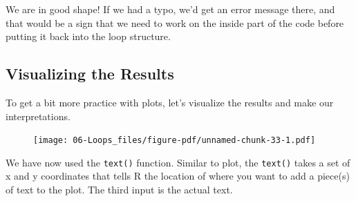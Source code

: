 \documentclass[
  letterpaper,
  DIV=11,
  numbers=noendperiod]{scrreprt}
\newenvironment{Shaded}{\begin{snugshade}}{\end{snugshade}}
\newcommand{\AttributeTok}[1]{\textcolor[rgb]{0.40,0.45,0.13}{#1}}
\newcommand{\DecValTok}[1]{\textcolor[rgb]{0.68,0.00,0.00}{#1}}
\newcommand{\DocumentationTok}[1]{\textcolor[rgb]{0.37,0.37,0.37}{\textit{#1}}}
\newcommand{\FloatTok}[1]{\textcolor[rgb]{0.68,0.00,0.00}{#1}}
\newcommand{\FunctionTok}[1]{\textcolor[rgb]{0.28,0.35,0.67}{#1}}
\newcommand{\NormalTok}[1]{\textcolor[rgb]{0.00,0.23,0.31}{#1}}
\newcommand{\OtherTok}[1]{\textcolor[rgb]{0.00,0.23,0.31}{#1}}
\newcommand{\SpecialCharTok}[1]{\textcolor[rgb]{0.37,0.37,0.37}{#1}}
\newcommand{\StringTok}[1]{\textcolor[rgb]{0.13,0.47,0.30}{#1}}
\begin{document}
We are in good shape! If we had a typo, we'd get an error message there,
and that would be a sign that we need to work on the inside part of the
code before putting it back into the loop structure.

\hypertarget{visualizing-the-results}{%
\subsection{Visualizing the Results}\label{visualizing-the-results}}

To get a bit more practice with plots, let's visualize the results and
make our interpretations.

\begin{Shaded}
\end{Shaded}

\begin{figure}[H]

{\centering \texttt{[image: 06-Loops\_files/figure-pdf/unnamed-chunk-33-1.pdf]}

}

\end{figure}

We have now used the \texttt{text()} function. Similar to plot, the
\texttt{text()} takes a set of x and y coordinates that tells R the
location of where you want to add a piece(s) of text to the plot. The
third input is the actual text.
\end{document}
